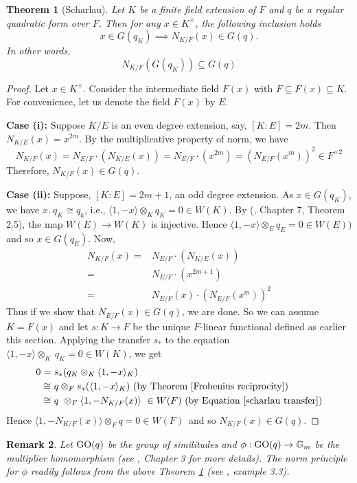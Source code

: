 \documentclass[sn-mathphys-num]{sn-jnl}%
\newtheorem{theorem}{Theorem}[section]
\newtheorem{remark}[theorem]{Remark}
\begin{document}
\begin{theorem}[Scharlau] \label{scharlau norm principle}
Let $K$ be a finite field extension of $F$ and $q$ be a regular quadratic form over $F$. Then for any $x \in K^\times$, the following inclusion holds 
    \[x \in G(q_K) \implies N_{K/F}(x) \in G(q).\]
    In other words, 
    \[N_{K/F}(G(q_K)) \subseteq G(q)\]
\end{theorem}
\begin{proof} 
Let $x \in K^\times $. Consider the intermediate field $F(x)$ with $F \subseteq F(x)\subseteq K $. For convenience, let us denote the field $F(x)$ by $E$.

\textbf{Case (i):} Suppose $K/E$ is an even degree extension, say, $[K:E]=2m$. Then $N_{K/E}(x)=x^{2m}$.
By the multiplicative property of norm, we have
    \[N_{K/F}(x)=N_{E/F}\cdot (N_{K/E}(x))=N_{E/F} \cdot (x^{2m})=(N_{E/F}(x^m))^2 \in F^{\times 2} \]
Therefore, $N_{K/F}(x) \in G(q)$.
\medskip 

\textbf{Case (ii):} Suppose, $[K:E]=2m+1$, an odd degree extension. As $x \in G(q_K)$, we have $x.\ q_K \cong q_k$, i.e., $\langle 1, -x \rangle \otimes_K q_K=0 \in W(K)$. By (\cite{lam}, Chapter 7, Theorem 2.5), the map $W(E) \to W(K)$ is injective. 
Hence $\langle 1,-x\rangle\otimes_E q_{E}=0 \in W(E))$ and so $x \in G(q_{E})$. Now, 
\begin{align*}
N_{K/F}(x)= &N_{E/F}\cdot (N_{K/E}(x))\\= &N_{E/F} \cdot (x^{2m+1})\\ 
= &N_{E/F}(x) \cdot  (N_{E/F}(x^m))^2
\end{align*}
Thus if we show that $N_{E/F}(x) \in G(q)$, we are done. So we can assume $K=F(x)$ and let $s: K \to F$ be the unique $F$-linear functional defined as earlier this section. %
Applying the transfer $s_*$ to the equation $\langle 1,-x \rangle   \otimes_K \ q_K =0 \in W(K)$, we get
\begin{align*}
    0=\ & s_*(q_K \otimes _K \langle 1,-x \rangle  _{K})\\ \cong\ & q \otimes _F s_*(\langle 1,-x \rangle  _{K})\ ( \text{by Theorem } \ref{Frobenius reciprocity})\\
    \cong\ & q\ \otimes _F \langle 1,-N_{K/F}(x) \rangle  \ \in W(F)\ (\text{by Equation } \ref{scharlau transfer})
\end{align*}
Hence $\langle 1,-N_{K/F}(x) \rangle \otimes_F q =0 \in W(F)$\ and so $N_{K/F}(x) \in G(q)$.
\end{proof}
\medskip 
\begin{remark}
    Let ${\rm GO}(q)$ be the group of similitudes and $\phi: {\rm GO}(q) \to \mathbb G_m$ be the multiplier homomorphism (see \cite{kmrt}, Chapter 3 for more details). The norm principle for $\phi$ readily follows from the above Theorem \ref{scharlau norm principle} (see \cite{bm}, example 3.3).
\end{remark}
\medskip 
\end{document}
